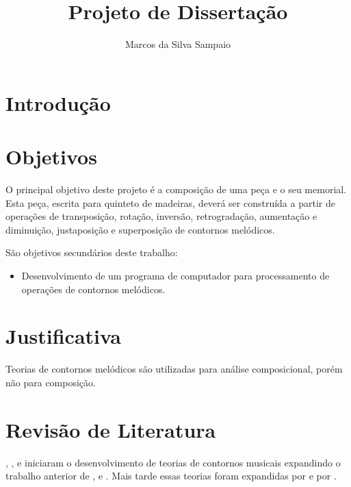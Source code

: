 \documentclass{article}
\begin{document}
\title{Projeto de Dissertação}
\author{Marcos da Silva Sampaio}
\maketitle

\thispagestyle{empty}

\setlength{\parindent}{0cm}

\section{Introdução}
\label{sec:introducao}

\section{Objetivos}
\label{sec:objetivos}

O principal objetivo deste projeto é a composição de uma peça e o seu
memorial. Esta peça, escrita para quinteto de madeiras, deverá ser
construída a partir de operações de transposição, rotação, inversão,
retrogradação, aumentação e diminuição, justaposição e superposição de
contornos melódicos.

São objetivos secundários deste trabalho:

\begin{itemize}
\item Desenvolvimento de um programa de computador para processamento
  de operações de contornos melódicos.
\end{itemize}

\section{Justificativa}
\label{sec:justificativa}


Teorias de contornos melódicos são utilizadas para análise
composicional, porém não para composição.

\section{Revisão de Literatura}
\label{sec:revis-de-liter}

,
, 
e  iniciaram o
desenvolvimento de teorias de contornos musicais expandindo o trabalho
anterior de ,
 e
. Mais tarde essas teorias foram expandidas
por  e por
.
\end{document}
